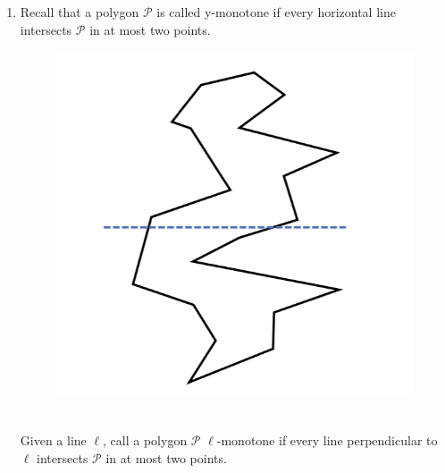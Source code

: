 \documentclass[a4paper, 8pt, oneside]{article}
\newenvironment{sol}
    {\emph{Solution:}
    }
    {
    \qed
    }
\begin{document}
\begin{enumerate}
\begin{sol}
\textbf{Algorithm} HANDLEEVENTPOINT$(p, q$)\\
\begin{enumerate}
\item if $q$ is right point in the segment delete $q$ segment from $\mathcal{T}$.
\item the closet segment $s_i$ in $\mathcal{T}$ to $p$ is visible.
\item if $q$ is left point in the segment insert the segment to $\mathcal{T}$
\end{enumerate}
Time complexity analysis - \\
Constructing the event queue is $\mathcal{O}(n\log{}n)$ \\
 iterate over all events $\mathcal{O}(n)$ and for each we update $\mathcal{T}$ which take $\mathcal{O}(\log{}n)$. \\
 So we get $\mathcal{O}(n\log{}n)$.
\end{sol}

\item \label{item:q2}  Recall that a polygon $\mathcal{P}$ is called y-monotone if every horizontal line  intersects $\mathcal{P}$ in at most two points. \\
\begin{figure}[h]
\includegraphics[scale=0.5]{example2}
\centering
\end{figure} \\
Given a line $\ell$, call a polygon $\mathcal{P}$ $\ell$-monotone if every line perpendicular to $\ell$ intersects $\mathcal{P}$ in at most two points. \\ 


\end{enumerate}
\end{document}
